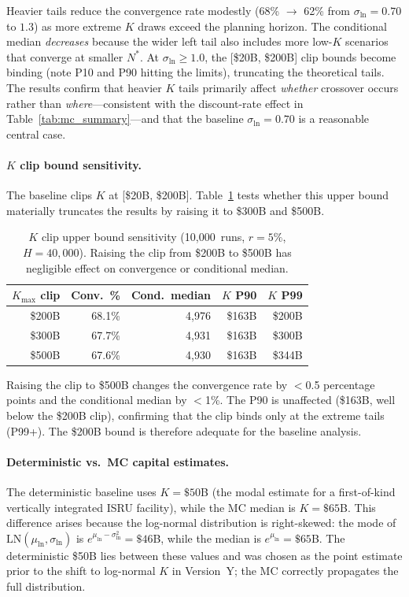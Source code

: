 \documentclass[preprint,12pt]{elsarticle}
\begin{document}
Heavier tails reduce the convergence rate modestly (68\% $\to$ 62\% from $\sigma_{\ln} = 0.70$ to $1.3$) as more extreme $K$ draws exceed the planning horizon. The conditional median \emph{decreases} because the wider left tail also includes more low-$K$ scenarios that converge at smaller $N^*$. At $\sigma_{\ln} \geq 1.0$, the [\$20B, \$200B] clip bounds become binding (note P10 and P90 hitting the limits), truncating the theoretical tails. The results confirm that heavier $K$ tails primarily affect \emph{whether} crossover occurs rather than \emph{where}---consistent with the discount-rate effect in Table~\ref{tab:mc_summary}---and that the baseline $\sigma_{\ln} = 0.70$ is a reasonable central case.

\paragraph{$K$ clip bound sensitivity.} The baseline clips $K$ at [\$20B, \$200B]. Table~\ref{tab:k_clip} tests whether this upper bound materially truncates the results by raising it to \$300B and \$500B.

\begin{table}[htbp]
\centering
\caption{$K$ clip upper bound sensitivity (10{,}000~runs, $r = 5\%$, $H = 40{,}000$). Raising the clip from \$200B to \$500B has negligible effect on convergence or conditional median.}
\label{tab:k_clip}
\small
\begin{tabular}{@{}rrrrr@{}}
\toprule
$K_{\max}$ clip & Conv.\ \% & Cond.\ median & $K$ P90 & $K$ P99 \\
\midrule
\$200B & 68.1\% & 4{,}976 & \$163B & \$200B \\
\$300B & 67.7\% & 4{,}931 & \$163B & \$300B \\
\$500B & 67.6\% & 4{,}930 & \$163B & \$344B \\
\bottomrule
\end{tabular}
\end{table}

Raising the clip to \$500B changes the convergence rate by $<$0.5 percentage points and the conditional median by $<$1\%. The P90 is unaffected (\$163B, well below the \$200B clip), confirming that the clip binds only at the extreme tails (P99+). The \$200B bound is therefore adequate for the baseline analysis.

\paragraph{Deterministic vs.\ MC capital estimates.} The deterministic baseline uses $K = \$50$B (the modal estimate for a first-of-kind vertically integrated ISRU facility), while the MC median is $K = \$65$B. This difference arises because the log-normal distribution is right-skewed: the mode of $\mathrm{LN}(\mu_{\ln}, \sigma_{\ln})$ is $e^{\mu_{\ln} - \sigma_{\ln}^2} = \$46$B, while the median is $e^{\mu_{\ln}} = \$65$B. The deterministic \$50B lies between these values and was chosen as the point estimate prior to the shift to log-normal $K$ in Version~Y; the MC correctly propagates the full distribution.
\end{document}
